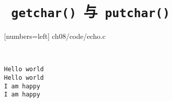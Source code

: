 \section{\lstinline| getchar() |与\lstinline| putchar() |}

\begin{frame}[fragile]\ft{\secname}
  \begin{minipage}{0.65\textwidth}
    
    [numbers=left]
    {ch08/code/echo.c}    
  \end{minipage}~~\pause 
  \begin{minipage}{0.3\textwidth}
    \begin{lstlisting}[backgroundcolor=\color{blue!20}]
Hello world 
Hello world
I am happy
I am happy
\end{lstlisting}    
  \end{minipage}
\end{frame}
